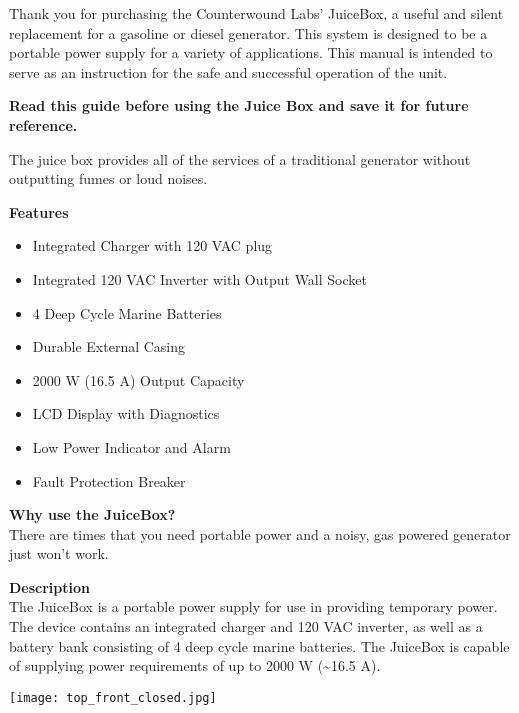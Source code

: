 \documentclass[../jb_user_manual.tex]{subfiles}
\begin{document}
\begin{flushleft}

\par Thank you for purchasing the Counterwound Labs' JuiceBox, a useful and silent replacement for a gasoline or diesel generator. This system is designed to be a portable power supply for a variety of applications. This manual is intended to serve as an instruction for the safe and successful operation of the unit.

\vspace{4mm} 
\noindent 
\textbf{Read this guide before using the Juice Box and save it for future reference.}

\vspace{4mm}
The juice box provides all of the services of a traditional generator without outputting fumes or loud noises.

\vspace{6mm}
\begin{Large}
	\textbf{Features}
\end{Large}

\begin{itemize}
	\item{Integrated Charger with 120 VAC plug}
	\item{Integrated 120 VAC Inverter with Output Wall Socket}
	\item{4 Deep Cycle Marine Batteries}
	\item{Durable External Casing}
	\item{2000 W (16.5 A) Output Capacity}
	\item{LCD Display with Diagnostics}
	\item{Low Power Indicator and Alarm}
	\item{Fault Protection Breaker} 

\end{itemize}

\newpage

\textbf{Why use the JuiceBox?} \\
There are times that you need portable power and a noisy, gas powered generator just won't work. 

\vspace{8mm}

\textbf{Description} \\
The JuiceBox is a portable power supply for use in providing temporary power.  The device contains an integrated charger and 120 VAC inverter, as well as a battery bank consisting of 4 deep cycle marine batteries.  The JuiceBox is capable of supplying power requirements of up to 2000 W (\~{}16.5 A).

\texttt{[image: top\_front\_closed.jpg]}

\end{flushleft}
\end{document}
